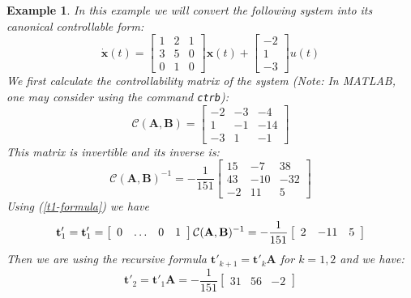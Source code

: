 \documentclass[a4paper,10pt,oneside]{book}
\newtheorem{example}{Example}
\begin{document}
\begin{example}
 In this example we will convert the following system into its canonical controllable form:
\begin{equation}
 \dot{\mathbf{x}}(t)=\left[ {\begin{array}{ccc}
 1 & 2 & 1  \\
 3 & 5 & 0  \\
 0 & 1 & 0
 \end{array} } \right]
\mathbf{x}(t)+ 
\left[ {\begin{array}{c}
 -2  \\
 1  \\
 -3 
 \end{array} } \right]
u(t)
\end{equation}
We first calculate the controllability matrix of the system (Note: In MATLAB, one may consider using the command \texttt{ctrb}): 
\begin{equation}
 \mathcal{C}(\mathbf{A},\mathbf{B})=\left[ {\begin{array}{ccc}
 -2 & -3 & -4  \\
 1 & -1 & -14  \\
 -3 & 1 & -1
 \end{array} } \right]
\end{equation}
This matrix is invertible and its inverse is:
\begin{equation}
 \mathcal{C}(\mathbf{A},\mathbf{B})^{-1}=-\frac{1}{151}\left[ {\begin{array}{ccc}
 15 & -7 & 38  \\
 43 & -10 & -32  \\
 -2 & 11 & 5
 \end{array} } \right]
\end{equation}
Using (\ref{t1-formula}) we have
\begin{equation}
 \mathbf{t}'_1=\mathbf{t}'_1=\left[ {\begin{array}{*{4}c} 0 & \ldots & 0 & 1 \end{array} } \right]\mathcal{C}(\mathbf{A},\mathbf{B})^{-1}=-\frac{1}{151}\left[ {\begin{array}{ccc} 2 & -11 & 5 \end{array} } \right]
\end{equation}
Then we are using the recursive formula $\mathbf{t}'_{k+1}=\mathbf{t}'_{k}\mathbf{A}$ for $k=1,2$ and we have:
\begin{equation}
 \mathbf{t}'_2=\mathbf{t}'_1\mathbf{A}=-\frac{1}{151}\left[ {\begin{array}{ccc} 31 & 56 & -2 \end{array} } \right]

\end{equation}
\end{example}
\end{document}
